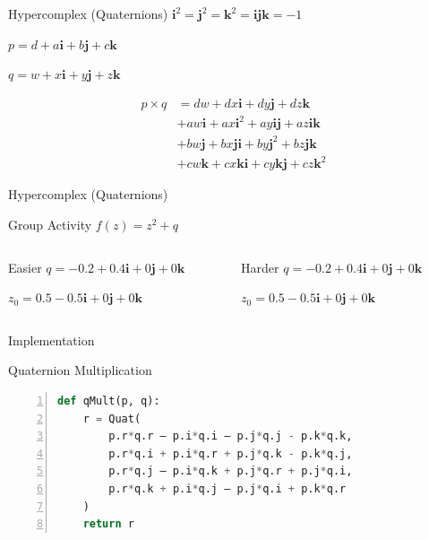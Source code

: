 \documentclass[aspectratio=169,t]{beamer}
\begin{document}
\begin{frame}[label={sec:org14292ca}]{Hypercomplex (Quaternions)}
\(\symbf{i}^2 = \symbf{j}^2 = \symbf{k}^2 = \symbf{ijk} = -1\)

\(p = d + a\symbf{i} + b\symbf{j} + c\symbf{k}\)

\(q = w + x\symbf{i} + y\symbf{j} + z\symbf{k}\)

\begin{align*}
    p \times q & = dw + dx\symbf{i} + dy\symbf{j} + dz\symbf{k} \\
    & + aw\symbf{i} + ax\symbf{i}^2 + ay\symbf{ij} + az\symbf{ik} \\
    & + bw\symbf{j} + bx\symbf{ji} + by\symbf{j}^2 + bz\symbf{jk} \\
    & + cw\symbf{k} + cx\symbf{ki} + cy\symbf{kj} + cz\symbf{k}^2
\end{align*}
\end{frame}

\begin{frame}[label={sec:orgc3606f6}]{Hypercomplex (Quaternions)}
\end{frame}

\begin{frame}[label={sec:orgd1b4a95}]{Group Activity}
\(f(z) = z^2 + q\)

\begin{columns}
\begin{column}{0.5\columnwidth}
\begin{block}{Easier}
\(q = -0.2 + 0.4\symbf{i} + 0\symbf{j} + 0\symbf{k}\)

\(z_0 = 0.5 - 0.5\symbf{i} + 0\symbf{j} + 0\symbf{k}\)
\end{block}
\end{column}

\begin{column}{0.5\columnwidth}
\begin{block}{Harder}
\(q = -0.2 + 0.4\symbf{i} + 0\symbf{j} + 0\symbf{k}\)

\(z_0 = 0.5 - 0.5\symbf{i} + 0\symbf{j} + 0\symbf{k}\)
\end{block}
\end{column}
\end{columns}
\end{frame}

\begin{frame}[label={sec:org96ffbc5},fragile]{Implementation}
 \begin{block}{Quaternion Multiplication}
\begin{lstlisting}[language=Python,firstnumber=1,numbers=left]
def qMult(p, q):
    r = Quat(
        p.r*q.r – p.i*q.i – p.j*q.j - p.k*q.k,
        p.r*q.i + p.i*q.r + p.j*q.k - p.k*q.j,
        p.r*q.j – p.i*q.k + p.j*q.r + p.j*q.i,
        p.r*q.k + p.i*q.j – p.j*q.i + p.k*q.r
    )
    return r
\end{lstlisting}
\end{block}
\end{frame}
\end{document}
